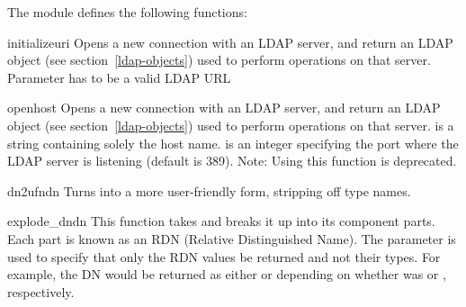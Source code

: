 The  module defines the following functions:


\begin{funcdesc}{initialize}{uri} %
  Opens a new connection with an LDAP server, and return an LDAP object
  (see section~\ref{ldap-objects}) used to perform operations on that server.
  Parameter  has to be a valid LDAP URL
  \begin{seealso}
  \end{seealso}
\end{funcdesc}

\begin{funcdesc}{open}{host } %
  Opens a new connection with an LDAP server, and return an LDAP object
  (see section~\ref{ldap-objects}) used to perform operations on that server.
   is a string containing solely the host name. 
  is an integer specifying the port where the LDAP server is
  listening (default is 389).
  Note: Using this function is deprecated.
\end{funcdesc}

\begin{funcdesc}{dn2ufn}{dn} %
  Turns  into a more user-friendly form, stripping off type names.
  \begin{seealso}
  \end{seealso}
\end{funcdesc}

\begin{funcdesc}{explode_dn}{dn } %
  This function takes  and breaks it up into its component parts. 
  Each part is known as an RDN (Relative Distinguished Name). The
   parameter is used to specify that only the RDN values be 
  returned and not their types.
  For example, the DN  would be
  returned as either \code{["cn=Bob", "c=US"]} or \code{["Bob","US"]}
  depending on whether  was  or ,
  respectively.
  \begin{seealso}
  \end{seealso}
\end{funcdesc}

